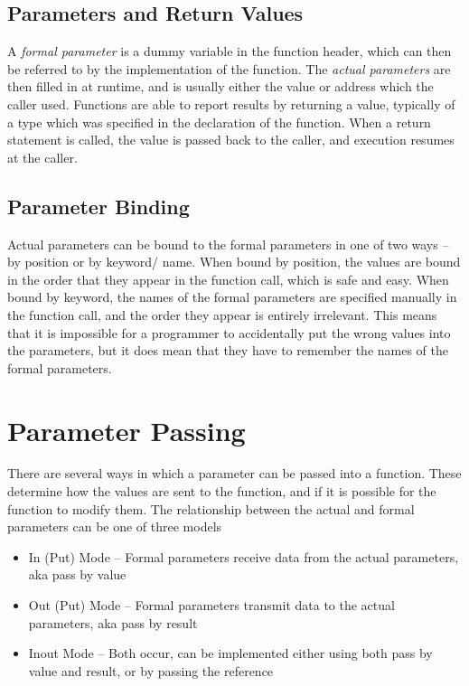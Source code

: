 \subsection*{Parameters and Return Values}

A \textit{formal parameter} is a dummy variable in the function header, which can then be referred to by the implementation
 of the function. The \textit{actual parameters} are then filled in at runtime, and is usually either the value or
 address which the caller used. Functions are able to report results by returning a value, typically of a type which was
 specified in the declaration of the function. When a return statement is called, the value is passed back to the caller,
 and execution resumes at the caller.

\subsection*{Parameter Binding}

Actual parameters can be bound to the formal parameters in one of two ways -- by position or by keyword/ name. When bound
 by position, the values are bound in the order that they appear in the function call, which is safe and easy. When bound
 by keyword, the names of the formal parameters are specified manually in the function call, and the order they appear
 is entirely irrelevant. This means that it is impossible for a programmer to accidentally put the wrong values into the
 parameters, but it does mean that they have to remember the names of the formal parameters.

\section*{Parameter Passing}

There are several ways in which a parameter can be passed into a function. These determine how the values are sent to the
 function, and if it is possible for the function to modify them. The relationship between the actual and formal
 parameters can be one of three models
\begin{itemize}
  \item In (Put) Mode -- Formal parameters receive data from the actual parameters, aka pass by value
  \item Out (Put) Mode -- Formal parameters transmit data to the actual parameters, aka pass by result
  \item Inout Mode -- Both occur, can be implemented either using both pass by value and result, or by passing the reference
\end{itemize}

